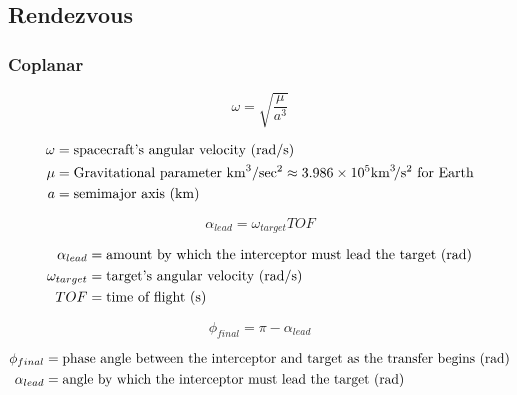 \documentclass{article}
\newcommand{\myvarmukm}{\mu &= \text{Gravitational parameter \si{\kilo\meter\cubed\per\sec\squared}} \approx 3.986 \times 10^5 \si{\kilo\meter\cubed\per\second\squared} \text{ for Earth}}
\newcommand{\myvara}{a &= \text{semimajor axis (\si{\kilo\meter})}}
\begin{document}
\subsection{Rendezvous}
\subsubsection{Coplanar}
\begin{multicols}{3}
	\begin{equation*}
	\boxed{\omega = \sqrt{\dfrac{\mu}{a^3}}}
	\end{equation*}
	
	\vfill\null
	\columnbreak
	\begin{align*}
	\omega &= \text{spacecraft's angular velocity (\si{\radian\per\second})}\\
	\myvarmukm\\
	\myvara\\
	\end{align*}
\end{multicols}

\begin{multicols}{3}
	\begin{equation*}
	\boxed{\alpha_{lead} = \omega_{target}TOF}
	\end{equation*}
	
	\vfill\null
	\columnbreak
	\begin{align*}
	\alpha_{lead} &= \text{amount by which the interceptor must lead the target (\si{\radian})}\\
	\omega_{target} &= \text{target's angular velocity (\si{\radian\per\second})}\\
	TOF &= \text{time of flight (\si{\second})}\\
	\end{align*}
\end{multicols}

\begin{multicols}{3}
	\begin{equation*}
	\boxed{\phi_{final} = \pi - \alpha_{lead}}
	\end{equation*}
	
	\vfill\null
	\columnbreak
	\begin{align*}
	\phi_{final} &= \text{phase angle between the interceptor and target as the transfer begins (\si{\radian})}\\
	\alpha_{lead} &= \text{angle by which the interceptor must lead the target (\si{\radian})}\\
	\end{align*}
\end{multicols}
\end{document}
